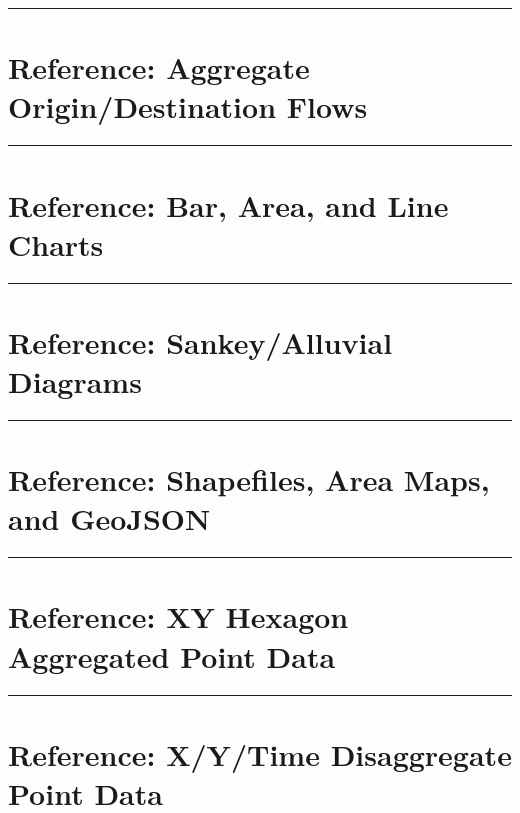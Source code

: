 \begin{center}\rule{0.5\linewidth}{0.5pt}\end{center}
\section{Reference: Aggregate Origin/Destination Flows}


\begin{center}\rule{0.5\linewidth}{0.5pt}\end{center}
\section{Reference: Bar, Area, and Line Charts}


\begin{center}\rule{0.5\linewidth}{0.5pt}\end{center}
\section{Reference: Sankey/Alluvial Diagrams}


\begin{center}\rule{0.5\linewidth}{0.5pt}\end{center}
\section{Reference: Shapefiles, Area Maps, and GeoJSON}


\begin{center}\rule{0.5\linewidth}{0.5pt}\end{center}
\section{Reference: XY Hexagon Aggregated Point Data}


\begin{center}\rule{0.5\linewidth}{0.5pt}\end{center}
\section{Reference: X/Y/Time Disaggregate Point Data}

